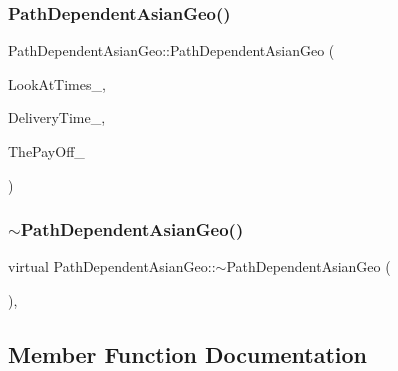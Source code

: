 \subsubsection{\texorpdfstring{Path\+Dependent\+Asian\+Geo()}{PathDependentAsianGeo()}}
{\footnotesize\ttfamily Path\+Dependent\+Asian\+Geo\+::\+Path\+Dependent\+Asian\+Geo (\begin{DoxyParamCaption}\item[{const \hyperlink{classMJArray}{M\+J\+Array} \&}]{Look\+At\+Times\+\_\+,  }\item[{double}]{Delivery\+Time\+\_\+,  }\item[{const \hyperlink{classPayOffBridge}{Pay\+Off\+Bridge} \&}]{The\+Pay\+Off\+\_\+ }\end{DoxyParamCaption})}

\hypertarget{classPathDependentAsianGeo_acef4f802715b8ed69258c71a7c02f1e8}{}\label{classPathDependentAsianGeo_acef4f802715b8ed69258c71a7c02f1e8} 
\subsubsection{\texorpdfstring{$\sim$\+Path\+Dependent\+Asian\+Geo()}{~PathDependentAsianGeo()}}
{\footnotesize\ttfamily virtual Path\+Dependent\+Asian\+Geo\+::$\sim$\+Path\+Dependent\+Asian\+Geo (\begin{DoxyParamCaption}{ }\end{DoxyParamCaption})\hspace{0.3cm}{\ttfamily [inline]}, {\ttfamily [virtual]}}



\subsection{Member Function Documentation}
\hypertarget{classPathDependentAsianGeo_a8eb2e111e62e2dae653a9146d2baa2ee}{}\label{classPathDependentAsianGeo_a8eb2e111e62e2dae653a9146d2baa2ee} 
